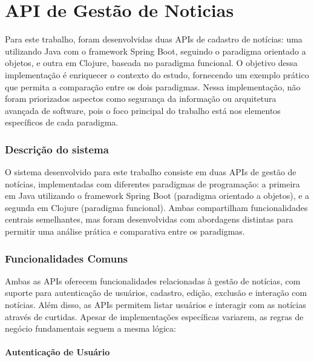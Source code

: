 \chapter{API de Gestão de Noticias}

Para este trabalho, foram desenvolvidas duas APIs de cadastro de notícias: uma utilizando Java com o framework Spring Boot, seguindo o paradigma orientado a objetos, e outra em Clojure, baseada no paradigma funcional. O objetivo dessa implementação é enriquecer o contexto do estudo, fornecendo um exemplo prático que permita a comparação entre os dois paradigmas. Nessa implementação, não foram priorizados aspectos como segurança da informação ou arquitetura avançada de software, pois o foco principal do trabalho está nos elementos específicos de cada paradigma.


\subsection{Descrição do sistema}

O sistema desenvolvido para este trabalho consiste em duas APIs de gestão de notícias, implementadas com diferentes paradigmas de programação: a primeira em Java utilizando o framework Spring Boot (paradigma orientado a objetos), e a segunda em Clojure (paradigma funcional). Ambas compartilham funcionalidades centrais semelhantes, mas foram desenvolvidas com abordagens distintas para permitir uma análise prática e comparativa entre os paradigmas.

\subsection{Funcionalidades Comuns}

Ambas as APIs oferecem funcionalidades relacionadas à gestão de notícias, com suporte para autenticação de usuários, cadastro, edição, exclusão e interação com notícias. Além disso, as APIs permitem listar usuários e interagir com as notícias através de curtidas. Apesar de implementações específicas variarem, as regras de negócio fundamentais seguem a mesma lógica:

\subsubsection{Autenticação de Usuário}


